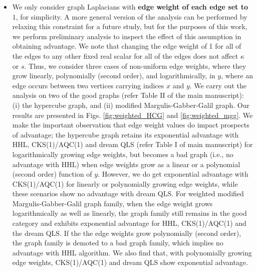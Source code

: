 \documentclass[%
 reprint,
 superscriptaddress,
 amsmath,amssymb,
 aps,
 pra,
floatfix,
nofootinbib,
]{revtex4-2}
\theoremstyle{definition}
\theoremstyle{remark}
\begin{document}
\begin{appendix}
\begin{itemize}
\item We only consider graph Laplacians with \textbf{edge weight of each edge set to $1$}, for simplicity. A more general version of the analysis can be performed by relaxing this constraint for a future study, but for the purposes of this work, we perform preliminary analysis to inspect the effect of this assumption in obtaining advantage. We note that changing the edge weight of 1 for all of the edges to any other fixed real scalar for all of the edges does not affect $\kappa$ or $s$. Thus, we consider three cases of non-uniform edge weights, where they grow linearly, polynomially (second order), and logarithmically, in $y$, where an edge occurs between two vertices carrying indices $x$ and $y$. We carry out the analysis on two of the good graphs (refer Table II of the main manuscript): (i) the hypercube graph, and (ii) modified Margulis-Gabber-Galil graph. Our results are presented in Figs. \ref{fig:weighted_HCG} and \ref{fig:weighted_mgg}. We make the important observation that edge weight values do impact prospects of advantage; the hypercube graph retains its exponential advantage with HHL, CKS(1)/AQC(1) and dream QLS (refer Table I of main manuscript) for logarithmically growing edge weights, but becomes a bad graph (i.e., no advantage with HHL) when edge weights grow as a linear or a polynomial (second order) function of $y$. However, we do get exponential advantage with CKS(1)/AQC(1) for linearly or polynomially growing edge weights, while these scenarios show no advantage with dream QLS. For weighted modified Margulis-Gabber-Galil graph family, when the edge weight grows logarithmically as well as linearly, the graph family still remains in the good category and exhibits exponential advantage for HHL, CKS(1)/AQC(1) and the dream QLS. If the the edge weights grow polynomially (second order), the graph family is demoted to a bad graph family, which implies no advantage with HHL algorithm. We also find that, with polynomially growing edge weights, CKS(1)/AQC(1) and dream QLS show exponential advantage. 


\end{itemize}
\end{appendix}
\end{document}
